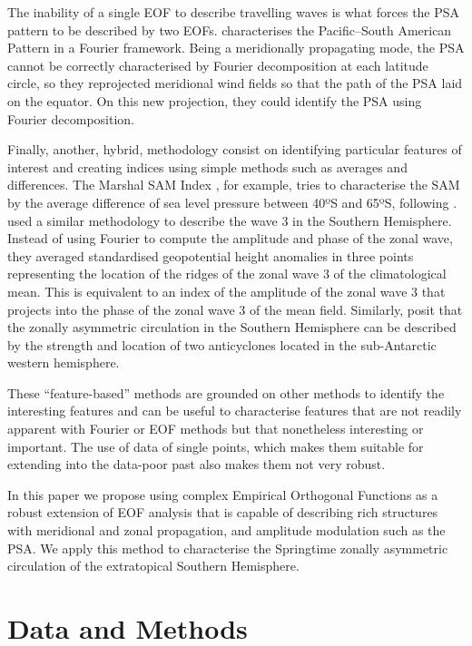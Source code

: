 \documentclass[smallextended]{svjour3}       %
\begin{document}
The inability of a single EOF to describe travelling waves is what forces the PSA pattern to be described by two EOFs. \citet{irving2016} characterises the Pacific--South American Pattern in a Fourier framework. Being a meridionally propagating mode, the PSA cannot be correctly characterised by Fourier decomposition at each latitude circle, so they reprojected meridional wind fields so that the path of the PSA laid on the equator. On this new projection, they could identify the PSA using Fourier decomposition.

Finally, another, hybrid, methodology consist on identifying particular features of interest and creating indices using simple methods such as averages and differences. The Marshal SAM Index \citep{marshall2003}, for example, tries to characterise the SAM by the average difference of sea level pressure between 40ºS and 65ºS, following \citet{gong1999}. \citet{raphael2004} used a similar methodology to describe the wave 3 in the Southern Hemisphere. Instead of using Fourier to compute the amplitude and phase of the zonal wave, they averaged standardised geopotential height anomalies in three points representing the location of the ridges of the zonal wave 3 of the climatological mean. This is equivalent to an index of the amplitude of the zonal wave 3 that projects into the phase of the zonal wave 3 of the mean field. Similarly, \citet{hobbs2010} posit that the zonally asymmetric circulation in the Southern Hemisphere can be described by the strength and location of two anticyclones located in the sub-Antarctic western hemisphere.

These ``feature-based'' methods are grounded on other methods to identify the interesting features and can be useful to characterise features that are not readily apparent with Fourier or EOF methods but that nonetheless interesting or important. The use of data of single points, which makes them suitable for extending into the data-poor past also makes them not very robust.

In this paper we propose using complex Empirical Orthogonal Functions \citep{horel1984} as a robust extension of EOF analysis that is capable of describing rich structures with meridional and zonal propagation, and amplitude modulation such as the PSA. We apply this method to characterise the Springtime zonally asymmetric circulation of the extratopical Southern Hemisphere.

\hypertarget{data-and-methods}{%
\section{Data and Methods}\label{data-and-methods}}
\end{document}

